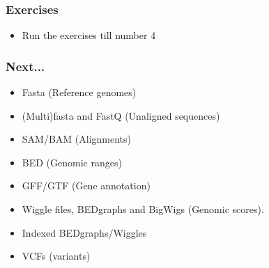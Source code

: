 \documentclass{beamer}
\begin{document}
\begin{frame}
  \frametitle{Exercises}
  \begin{itemize}
  \item Run the exercises till number 4
  \end{itemize}
\end{frame}


\begin{frame}
  \frametitle{Next...}
  \begin{itemize}

  \item Fasta (Reference genomes)

  \item (Multi)fasta and FastQ (Unaligned sequences)
 
  \item SAM/BAM (Alignments)
 
  \item BED (Genomic ranges)
 
  \item GFF/GTF (Gene annotation)
 
  \item Wiggle files, BEDgraphs and BigWigs (Genomic scores).
 
  \item Indexed BEDgraphs/Wiggles

  \item VCFs (variants)

  \end{itemize}
\end{frame}
\end{document}
